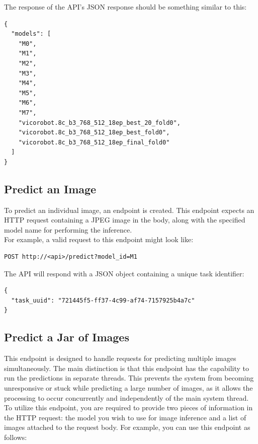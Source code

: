 The response of the API's JSON response should be something similar to this:

\begin{Verbatim}[fontsize=\scriptsize]
{
  "models": [
    "M0",
    "M1",
    "M2",
    "M3",
    "M4",
    "M5",
    "M6",
    "M7",
    "vicorobot.8c_b3_768_512_18ep_best_20_fold0",
    "vicorobot.8c_b3_768_512_18ep_best_fold0",
    "vicorobot.8c_b3_768_512_18ep_final_fold0"
  ]
}
\end{Verbatim}



\subsection{Predict an Image}

To predict an individual image, an endpoint is created.
This endpoint expects an HTTP request containing a JPEG image in the body,
along with the specified model name for performing the inference. \\

For example, a valid request to this endpoint might look like:

\begin{Verbatim}[fontsize=\scriptsize]
POST http://<api>/predict?model_id=M1
\end{Verbatim}

The API will respond with a JSON object containing a unique task identifier:

\begin{Verbatim}[fontsize=\scriptsize]
{
  "task_uuid": "721445f5-ff37-4c99-af74-7157925b4a7c"
}
\end{Verbatim}


\subsection{Predict a Jar of Images}

This endpoint is designed to handle requests for predicting multiple images
simultaneously. The main distinction is that this endpoint has the capability
to run the predictions in separate threads. This prevents the system from
becoming unresponsive or stuck while predicting a large number of images, as it
allows the processing to occur concurrently and independently of the main
system thread. \\

To utilize this endpoint, you are required to provide two pieces of information
in the HTTP request: the model you wish to use for image inference and a list
of images attached to the request body. For example, you can use this endpoint
as follows:

